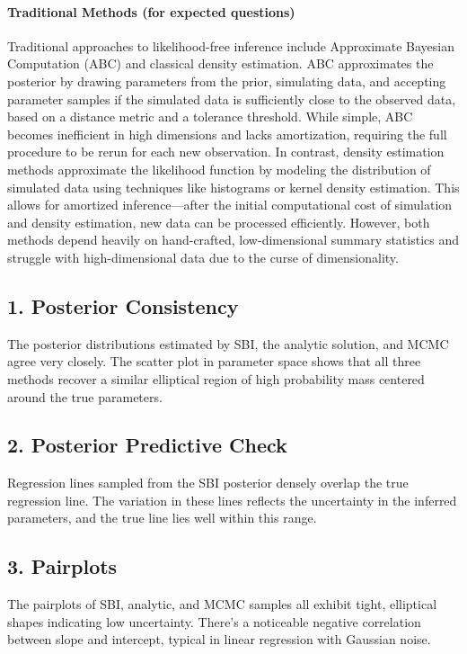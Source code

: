 \documentclass{article}
\begin{document}
\paragraph{Traditional Methods (for expected questions)} 
Traditional approaches to likelihood-free inference include Approximate Bayesian Computation (ABC) and classical density estimation. ABC approximates the posterior by drawing parameters from the prior, simulating data, and accepting parameter samples if the simulated data is sufficiently close to the observed data, based on a distance metric and a tolerance threshold. While simple, ABC becomes inefficient in high dimensions and lacks amortization, requiring the full procedure to be rerun for each new observation. In contrast, density estimation methods approximate the likelihood function by modeling the distribution of simulated data using techniques like histograms or kernel density estimation. This allows for amortized inference—after the initial computational cost of simulation and density estimation, new data can be processed efficiently. However, both methods depend heavily on hand-crafted, low-dimensional summary statistics and struggle with high-dimensional data due to the curse of dimensionality.

\subsection*{1. Posterior Consistency}
The posterior distributions estimated by SBI, the analytic solution, and MCMC agree very closely. The scatter plot in parameter space shows that all three methods recover a similar elliptical region of high probability mass centered around the true parameters.

\subsection*{2. Posterior Predictive Check}
Regression lines sampled from the SBI posterior densely overlap the true regression line. The variation in these lines reflects the uncertainty in the inferred parameters, and the true line lies well within this range.

\subsection*{3. Pairplots}
The pairplots of SBI, analytic, and MCMC samples all exhibit tight, elliptical shapes indicating low uncertainty. There's a noticeable negative correlation between slope and intercept, typical in linear regression with Gaussian noise.
\end{document}
